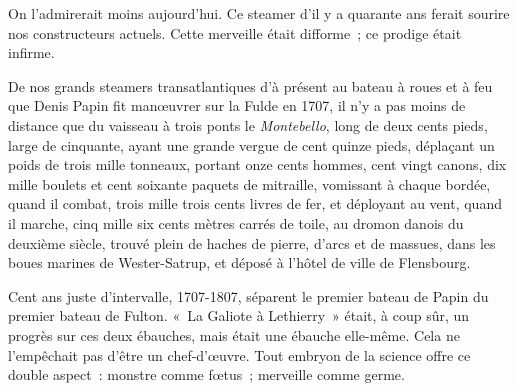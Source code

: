 \documentclass[french,twoside]{book} %
\begin{document}
On l’admirerait moins aujourd’hui. Ce steamer d’il  y a quarante ans ferait sourire nos constructeurs actuels. Cette merveille était difforme ; ce prodige était infirme.\par
De nos grands steamers transatlantiques d’à présent au bateau à roues et à feu que Denis Papin fit manœuvrer sur la Fulde en 1707, il n’y a pas moins de distance que du vaisseau à trois ponts le \emph{Montebello}, long de deux cents pieds, large de cinquante, ayant une grande vergue de cent quinze pieds, déplaçant un poids de trois mille tonneaux, portant onze cents hommes, cent vingt canons, dix mille boulets et cent soixante paquets de mitraille, vomissant à chaque bordée, quand il combat, trois mille trois cents livres de fer, et déployant au vent, quand il marche, cinq mille six cents mètres carrés de toile, au dromon danois du deuxième siècle, trouvé plein de haches de pierre, d’arcs et de massues, dans les boues marines de Wester-Satrup, et déposé à l’hôtel de ville de Flensbourg.\par
Cent ans juste d’intervalle, 1707-1807, séparent le premier bateau de Papin du premier bateau de Fulton. « La Galiote à Lethierry » était, à coup sûr, un progrès sur ces deux ébauches, mais était une ébauche elle-même. Cela ne l’empêchait pas d’être un chef-d’œuvre. Tout embryon de la science offre ce double aspect : monstre comme fœtus ; merveille comme germe.
\end{document}
